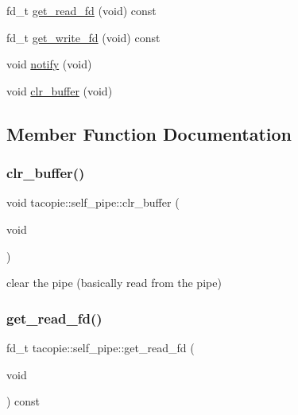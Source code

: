 \begin{DoxyCompactItemize}
fd\+\_\+t \hyperlink{classtacopie_1_1self__pipe_a301b416f5f8236a383065b381385b88c}{get\+\_\+read\+\_\+fd} (void) const
\item 
fd\+\_\+t \hyperlink{classtacopie_1_1self__pipe_ab36a4deb45bb408988f26315aedc0d74}{get\+\_\+write\+\_\+fd} (void) const
\item 
void \hyperlink{classtacopie_1_1self__pipe_ade9e0e3d19b8d4d22977935a578d508e}{notify} (void)
\item 
void \hyperlink{classtacopie_1_1self__pipe_a4f55a34bd882d59bdcc73b87222ba3d8}{clr\+\_\+buffer} (void)
\end{DoxyCompactItemize}


\subsection{Member Function Documentation}
\mbox{\label{classtacopie_1_1self__pipe_a4f55a34bd882d59bdcc73b87222ba3d8}} 
\subsubsection{\texorpdfstring{clr\+\_\+buffer()}{clr\_buffer()}}
{\footnotesize\ttfamily void tacopie\+::self\+\_\+pipe\+::clr\+\_\+buffer (\begin{DoxyParamCaption}\item[{void}]{ }\end{DoxyParamCaption})}

clear the pipe (basically read from the pipe) \mbox{\label{classtacopie_1_1self__pipe_a301b416f5f8236a383065b381385b88c}} 
\subsubsection{\texorpdfstring{get\+\_\+read\+\_\+fd()}{get\_read\_fd()}}
{\footnotesize\ttfamily fd\+\_\+t tacopie\+::self\+\_\+pipe\+::get\+\_\+read\+\_\+fd (\begin{DoxyParamCaption}\item[{void}]{ }\end{DoxyParamCaption}) const}

